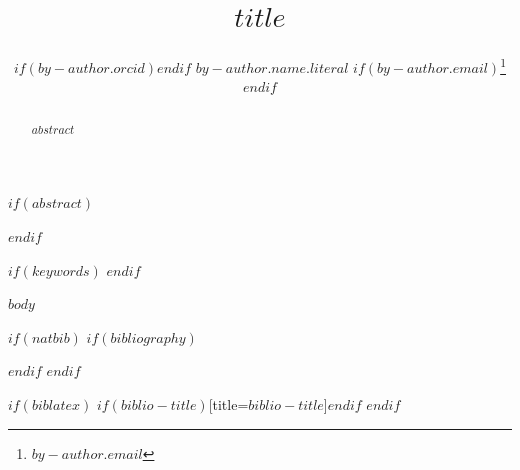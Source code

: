 \documentclass{article}
\title{$title$}
\author[$for(by-author.affiliations)$$it.id$$sep$,$endfor$]{%
  $if(by-author.orcid)$\href{https://orcid.org/$by-author.orcid$}{\usebox{\orcidbox}\hspace{1mm}}$endif$%
  $by-author.name.literal$%
  $if(by-author.email)$\thanks{\texttt{$by-author.email$}}$endif$%
}
\affil[$by-affiliation.id$]{$by-affiliation.name$}
\begin{document}
\maketitle

$if(abstract)$
\begin{abstract}
$abstract$
\end{abstract}
$endif$

$if(keywords)$
$endif$

$body$

$if(natbib)$
$if(bibliography)$

$endif$
$endif$

$if(biblatex)$
\printbibliography$if(biblio-title)$[title=$biblio-title$]$endif$
$endif$
\end{document}
